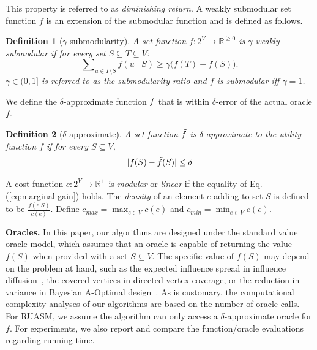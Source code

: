 \documentclass[10pt]{article} %
\newtheorem{definition}{Definition}
\theoremstyle{remark}
\begin{document}
This property is referred to as {\em diminishing return}. A weakly submodular set function $f$ \cite{das2011submodular} is an extension of the submodular function and is defined as follows.
\begin{definition}[$\gamma$-submodularity]
    \label{def:weak-sub}
        A set function $f:2^V \rightarrow \mathbb{R}^{\geq 0}$ is $\gamma$-weakly submodular if for every set $S \subseteq T \subseteq V$:
        \begin{equation}
        \label{eq:weak-submodularity}
            \sum\nolimits_{u\in T \setminus S} f(u \mid S)  \geq  \gamma \big(f(T)-f(S)\big).
        \end{equation}
        $\gamma \in (0,1]$ is referred to as the submodularity ratio and $f$ is submodular iff $\gamma=1$.  
\end{definition}
We define the $\delta$-approximate function $\Tilde{f}$ that is within $\delta$-error of the actual oracle $f$.
\begin{definition}[$\delta$-approximate]
\label{def:approximate}
A set function $\Tilde{f}$ is $\delta$-approximate to the utility function $f$ if for every $S \subseteq V$,
    \[  |f(S) - \Tilde{f}(S) | \leq \delta \]
\end{definition}

A cost function $c: 2^V \rightarrow \mathbb{R}^+$ is {\em modular} or {\em linear} if the equality of Eq. (\ref{eq:marginal-gain}) holds. The {\em density} of an element $e$ adding to set $S$ is defined to be $\frac{f(e|S)}{c(e)}$. Define $c_{max} = \max_{e \in V} c(e)$ and $c_{min} = \min_{e \in V} c(e)$.


\textbf{Oracles.} In this paper, our algorithms are designed under the standard value oracle model, which assumes that an oracle is capable of returning the value $f(S)$ when provided with a set $S \subseteq V$. The specific value of $f(S)$ may depend on the problem at hand, such as the expected influence spread in influence diffusion~\cite{kempe2003maximizing}, the covered vertices in directed vertex coverage, or the reduction in variance in Bayesian A-Optimal design~\cite{harshaw2019submodular}. 
As is customary, the computational complexity analyses of our algorithms are based on the number of oracle calls. For RUASM, we assume the algorithm can only access a $\delta$-approximate oracle for $f$. 
For experiments, we also report and compare the function/oracle evaluations regarding running time.

\let\classAND\AND
\let\AND\relax
\end{document}
